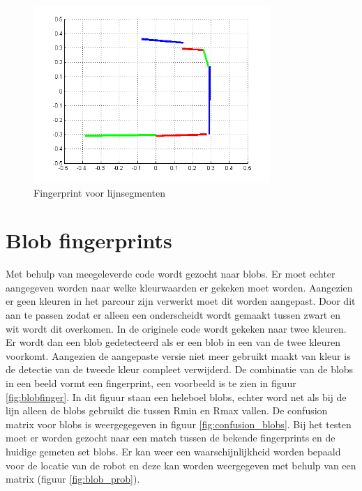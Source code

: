 \documentclass[a4paper]{article}
\begin{document}
\begin{figure}[h]
	\centering
	\includegraphics[width=0.8\textwidth]{fingerprint.png}
	\caption{Fingerprint voor lijnsegmenten}
	\label{fig:lijnfinger}
\end{figure}


\section{Blob fingerprints}
Met behulp van meegeleverde code wordt gezocht naar blobs. Er moet echter aangegeven worden naar welke kleurwaarden er gekeken moet worden. Aangezien er geen kleuren in het parcour zijn verwerkt moet dit worden aangepast. Door dit aan te passen zodat er alleen een onderscheidt wordt gemaakt tussen zwart en wit wordt dit overkomen. In de originele code wordt gekeken naar twee kleuren. Er wordt dan een blob gedetecteerd als er een blob in een van de twee kleuren voorkomt.  Aangezien de aangepaste versie niet meer gebruikt maakt van kleur is de detectie van de tweede kleur compleet verwijderd. 
De combinatie van de blobs in een beeld vormt een fingerprint, een voorbeeld is te zien in figuur \ref{fig:blobfinger}. In dit figuur staan een heleboel blobs, echter word net als bij de lijn alleen de blobs gebruikt die tussen Rmin en Rmax vallen. 
De confusion matrix voor blobs is weergegegeven in figuur \ref{fig:confusion_blobs}.
Bij het testen moet er worden gezocht naar een match tussen de bekende fingerprints en de huidige gemeten set blobs. Er kan weer een waarschijnlijkheid worden bepaald voor de locatie van de robot en deze kan worden weergegeven met behulp van een matrix (figuur \ref{fig:blob_prob}).
\end{document}
